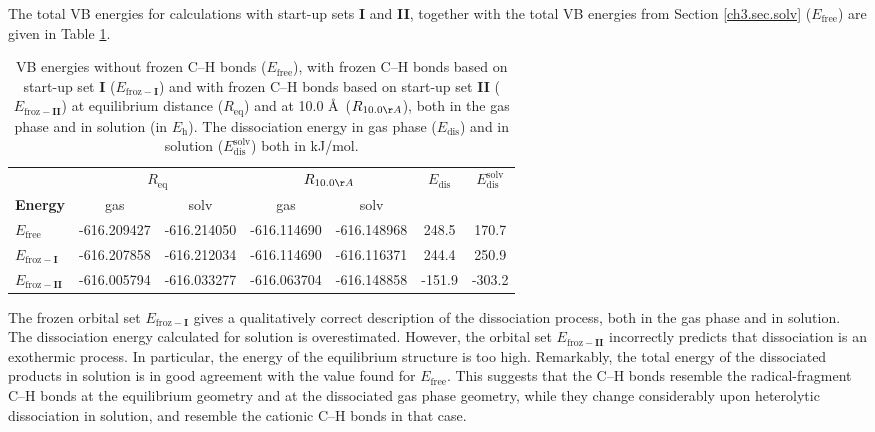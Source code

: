 The total VB energies for calculations with start-up sets \textbf{I} and \textbf{II}, together with the total VB energies from Section \ref{ch3.sec.solv} ($E_\mathrm{free}$) are given in Table \ref{ch3.tab.frozen}. 
\begin{table}[hbp]
\center
\caption{VB energies without frozen C--H bonds ($E_\mathrm{free}$), with frozen C--H bonds based on
start-up set \textbf{I} ($E_\mathrm{froz-\textbf{I}}$) and with frozen C--H bonds based on start-up set \textbf{II}
($E_\mathrm{froz-\textbf{II}}$) at equilibrium distance ($R_\mathrm{eq}$) and at 10.0 \AA\ ($R_{10.0 \AA}$),
both in the gas phase and in solution (in $E_\mathrm{h}$). The dissociation energy in gas phase ($E_\mathrm{dis}$) and in solution ($E_\mathrm{dis}^\mathrm{solv}$) both in kJ/mol.}
\center
\begin{tabular}{ l c c c c c c }
\hline
&\multicolumn{2}{c}{$R_\mathrm{eq}$}&\multicolumn{2}{c}{$R_{10.0 \AA}$} & $E_\mathrm{dis}$ & $E_\mathrm{dis}^\mathrm{solv}$ \\
\textbf{Energy} & gas & solv & gas & solv &&\\
\hline
$E_\mathrm{free}$      & -616.209427 & -616.214050 & -616.114690 & -616.148968 & 248.5 & 170.7 \\
$E_\mathrm{froz-\textbf{I}}$& -616.207858 & -616.212034 & -616.114690 & -616.116371 & 244.4 & 250.9 \\
$E_\mathrm{froz-\textbf{II}}$& -616.005794 & -616.033277 & -616.063704 & -616.148858 & -151.9 & -303.2 \\
\end{tabular}
\label{ch3.tab.frozen}
\end{table}

The frozen orbital set $E_{\mathrm{froz}-\textbf{I}}$ gives a qualitatively correct description of the dissociation process, both in the gas phase and in solution.  The dissociation energy calculated for solution is overestimated.  However, the orbital set $E_{\mathrm{froz}-\textbf{II}}$ incorrectly predicts that dissociation is an exothermic process.  In particular, the energy of the equilibrium structure is too high.  Remarkably, the total energy of the dissociated products in solution is in good agreement with the value found for $E_{\mathrm{free}}$.  This suggests that the C--H bonds resemble the radical-fragment C--H bonds at the equilibrium geometry and at the dissociated gas phase geometry, while they change considerably upon heterolytic dissociation in solution, and resemble the cationic C--H bonds in that case.

